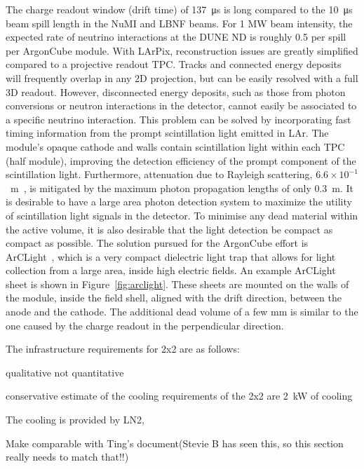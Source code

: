 The charge readout window (drift time) of \SI{137}{\micro\second} is long compared to the \SI{10}{\micro\second}~\cite{numi} beam spill length in the NuMI and LBNF beams.
For 1 MW beam intensity, the expected rate of neutrino interactions at the DUNE ND is roughly 0.5 per spill per ArgonCube module.  
With LArPix, reconstruction issues are greatly simplified compared to a projective readout TPC.
Tracks and connected energy deposits will frequently overlap in any 2D projection, but can be easily resolved with a full 3D readout.
However, disconnected energy deposits, such as those from photon conversions or neutron interactions in the detector, cannot easily be associated to a specific neutrino interaction.
This problem can be solved by incorporating fast timing information from the prompt scintillation light emitted in LAr.
The module's opaque cathode and walls contain scintillation light within each TPC (half module), improving the detection efficiency of the prompt component of the scintillation light. 
Furthermore, attenuation due to Rayleigh scattering, $6.6\times10^{-1}$~m~\cite{Rayleigh}, is mitigated by the maximum photon propagation lengths of only \SI{0.3}{\metre}. 
It is desirable to have a large area photon detection system to maximize the utility of scintillation light signals in the detector. 
To minimise any dead material within the active volume, it is also desirable that the light detection be compact as compact as possible. 
The solution pursued for the ArgonCube effort is ArCLight~\cite{arclight}, which is a very compact dielectric light trap that allows for light collection from a large area, inside high electric fields. 
An example ArCLight sheet is shown in Figure~\ref{fig:arclight}. These sheets are mounted on the walls of the module, inside the field shell, aligned with the drift direction, between the anode and the cathode. 
The additional dead volume of a few \si{\milli\metre} is similar to the one caused by the charge readout in the perpendicular direction.



The infrastructure requirements for 2x2 are as follows:

qualitative not quantitative


conservative estimate of the cooling requirements of the 2x2 are \SI{2}{\kilo\watt} of cooling 

The cooling is provided by LN2, 

 
Make comparable with Ting's document(Stevie B has seen this, so this section really needs to match that!!)


